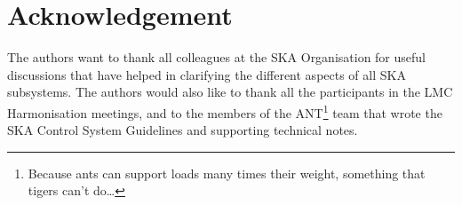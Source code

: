 \documentclass[a4paper,
               biblatex,       %
               keeplastbox,    %
               ]{jacow-2_1}    %
\begin{document}
\section{Acknowledgement} %
\label{sec:acknowledgement}
The authors want to thank all colleagues at the SKA Organisation for useful discussions that have helped in clarifying the different aspects of all SKA subsystems. The authors would also like to thank all the participants in the LMC Harmonisation meetings, and to the members of the ANT\footnote{Because ants can support loads many times their weight, something that tigers can't do…} team that wrote the SKA Control System Guidelines and supporting technical notes.


\label{sec:references}
\printbibliography

\end{document}
